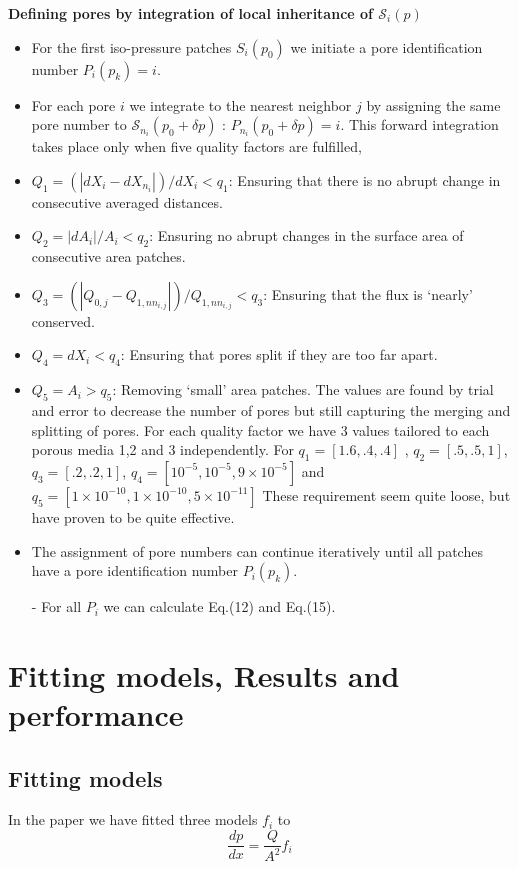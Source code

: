 \documentclass[draft,jgrga]{agutexSI2019}
\begin{document}
\begin{article}
\noindent\textbf{Defining pores by integration of local inheritance of $\mathcal{S}_i(p)$}
\begin{itemize}
	\item For the first iso-pressure patches $S_i(p_0)$ we initiate a pore identification number $P_i(p_k) = i$. 
	\item For each pore $i$ we integrate to the nearest neighbor $j$ by assigning the same pore number to $\mathcal{S}_{n_i}(p_0+\delta p)$ : $P_{n_i}(p_0+\delta p) = i$. This forward integration takes place only when five quality factors are fulfilled,
	\item $Q_1 = (|dX_i-dX_{n_i}|)/dX_i<q_1$: Ensuring that there is no abrupt change in consecutive averaged distances. 
	\item $Q_2 = |dA_i|/A_i<q_2$: Ensuring no abrupt changes in the surface area of consecutive area patches. 
	\item $Q_3 = (|Q_{0,j}-Q_{1,nn_{i,j}}|)/Q_{1,nn_{i,j}}<q_3$: Ensuring that the flux is `nearly' conserved.  
	\item $Q_4 = dX_i < q_4$: Ensuring that pores split if they are too far apart. 
	\item $Q_5 = A_i > q_5$: Removing `small' area patches. 
	The values are found by trial and error to decrease the number of pores but still capturing the merging and splitting of pores. For each quality factor we have 3 values tailored to each porous media 1,2 and 3 independently. For $q_1 = [1.6,.4,.4]$
, $q_2 = [.5,.5,1]$, $q_3 = [.2,.2,1]$, $q_4 = [10^{-5},10^{-5},9\times10^{-5}]$ and $q_5 = [1\times10^{-10},1\times10^{-10},5\times10^{-11}]$	These requirement seem quite loose, but have proven to be quite effective. 
	\item The assignment of pore numbers can continue iteratively until all patches have a pore identification number $P_i(p_k)$.	
	\item[-]For all $P_i$ we can calculate Eq.(12) and Eq.(15).
\end{itemize}



\section{Fitting models, Results and performance}
\subsection{Fitting models}
In the paper we have fitted three models $f_i$ to 
\begin{equation}
	\frac{dp}{dx} = \frac{Q}{A^2} f_i
\end{equation}



\end{article}
\end{document}
